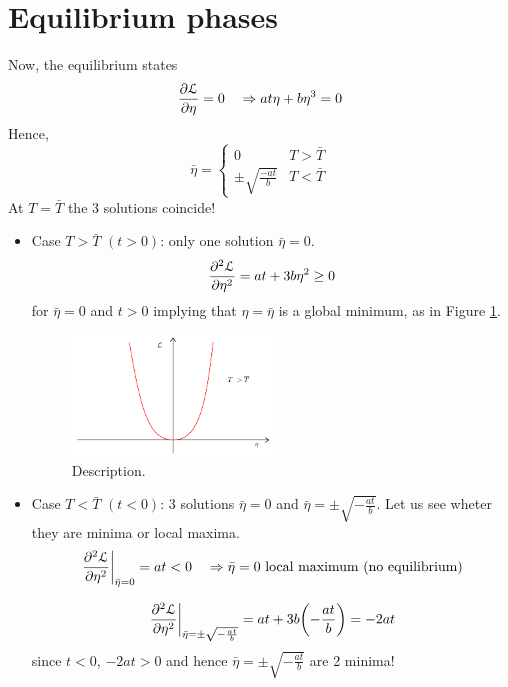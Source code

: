 \documentclass[../main/main.tex]{subfiles}
\begin{document}
\section{Equilibrium phases}
Now, the equilibrium states
\begin{equation}
  \pdv{\mathcal{L}}{\eta } = 0 \quad \Rightarrow  a t \eta + b \eta ^3 = 0
\end{equation}
Hence,
\begin{equation}
  \bar{\eta } =
  \begin{cases}
   0 & T > \bar{T} \\
   \pm \sqrt{\frac{-at}{b}} & T < \bar{T}
  \end{cases}
\end{equation}
At \( T= \bar{T}  \)  the 3 solutions coincide!
\begin{itemize}
\item Case \( T> \bar{T}  \) \( (t>0) \): only one solution \( \bar{\eta }=0  \).
\begin{equation}
  \pdv[2]{\mathcal{L}}{\eta } = a t + 3 b \eta ^2 \ge 0
\end{equation}
for \( \bar{\eta } = 0  \) and \( t>0 \) implying that \( \eta = \bar{\eta }  \) is a global minimum, as in Figure \ref{fig:15_10}.
\begin{figure}[h!]
\centering
\includegraphics[width=0.5\textwidth]{../lessons/15_image/13.pdf}
\caption{\label{fig:15_10} Description.}
\end{figure}
\item Case \( T< \bar{T}  \) \( (t<0) \): 3 solutions \( \bar{\eta } = 0  \) and \( \bar{\eta } = \pm \sqrt{- \frac{at}{b}}   \).
Let us see wheter they are minima or local maxima.
\begin{equation}
  \eval{\pdv[2]{\mathcal{L}}{\eta } }_{\bar{\eta } =0 } = a t < 0 \quad \Rightarrow \bar{\eta } = 0 \text{ local maximum (no equilibrium)}
\end{equation}

\begin{equation}
  \eval{\pdv[2]{\mathcal{L}}{\eta } }_{\bar{\eta } = \pm \sqrt{- \frac{at}{b}}  } = a t + 3 b \qty(- \frac{at}{b}) = -2at
\end{equation}
since \( t<0 \), \( -2at >0 \) and hence \( \bar{\eta } = \pm \sqrt{- \frac{at}{b}}   \) are 2 minima!


\end{itemize}
\end{document}
